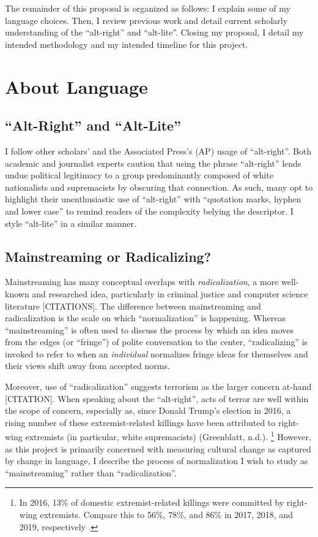 \documentclass[acmlarge, screen, authorversion]{acmart}
\begin{document}
 \medskip

The remainder of this proposal is organized as follows: I explain some of my language choices. Then, I review previous work and
detail current scholarly understanding of the “alt-right” and
“alt-lite”. Closing my proposal, I detail my intended methodology and my
intended timeline for this project.

\section{About Language}

\subsection{“Alt-Right” and “Alt-Lite”}

I follow other scholars’ \cite{hartzellAltWhiteConceptualizingAltRight, massanariRethinkingResearchEthics2018} and the
Associated Press’s (AP) \cite{johndaniszewskiWritingAltright2016} usage of “alt-right”.
Both academic and journalist experts caution that using the
phrase “alt-right” lends undue political legitimacy to a group predominantly
composed of white nationalists and supremacists by obscuring that
connection. As such, many opt to highlight their unenthusiastic use of
“alt-right” with “quotation marks, hyphen and lower case” 
\cite{johndaniszewskiWritingAltright2016} to remind readers of the complexity belying the
descriptor. I style “alt-lite” in a similar manner.

\subsection{Mainstreaming or Radicalizing?}

Mainstreaming has many
conceptual overlaps with \textit{radicalization}, a more well-known and researched idea, particularly in criminal justice and computer science literature [CITATIONS]. The
difference between mainstreaming and radicalization is the scale on
which “normalization” is happening. Whereas
“mainstreaming” is often used to discuss the process by which an idea
moves from the edges (or “fringe”) of polite conversation to the center, “radicalizing” is invoked to refer to when an \textit{individual}
normalizes fringe ideas for themselves and their views shift away from
accepted norms.

Moreover, use of “radicalization” suggests terrorism as the larger
concern at-hand [CITATION]. When speaking about the “alt-right”, acts of
terror are well within the scope of concern, especially as, since Donald
Trump’s election in 2016, a rising number of these extremist-related
killings have been attributed to right-wing extremists (in particular,
white supremacists) (Greenblatt, n.d.). \footnote{In 2016, 13\% of domestic extremist-related
killings were committed by right-wing extremists. Compare this to 56\%,
78\%, and 86\% in 2017, 2018, and 2019, respectively \cite{greenblattRightWingExtremistViolence}.
} However, as this project is primarily concerned with
measuring cultural change as captured by change in language, I describe
the process of normalization I wish to study as “mainstreaming” rather
than “radicalization”.
\end{document}
